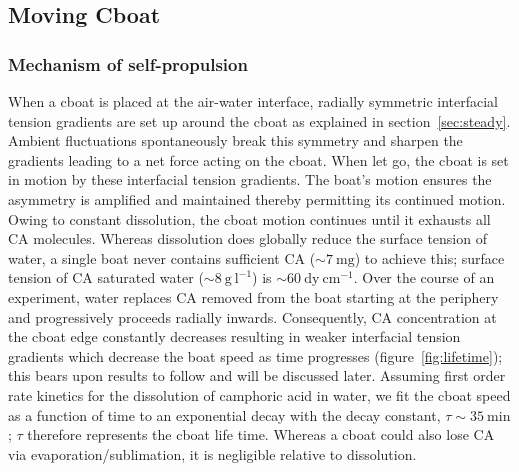 \documentclass[journal=langd5, manuscript=article, layout=twocolumn]{achemso}
\begin{document}
\subsection{Moving Cboat}
\subsubsection{Mechanism of self-propulsion}
\label{sec:propmech}
When a cboat is placed at the air-water interface, radially symmetric interfacial tension gradients are set up around the cboat as explained in section~\ref{sec:steady}. Ambient fluctuations spontaneously break this symmetry and sharpen the gradients leading to a net force acting on the cboat. When let go, the cboat is set in motion by these interfacial tension gradients. The boat's motion ensures the asymmetry is amplified and maintained thereby permitting its continued motion. Owing to constant dissolution, the cboat motion continues until it exhausts all CA molecules. Whereas dissolution does globally reduce the surface tension of water, a single boat never contains sufficient CA ($\sim 7\ \mathrm{mg}$) to achieve this; surface tension of CA saturated water ($\sim 8\ \mathrm{g\ l^{-1}}$) is $\sim 60\ \mathrm{dy\ cm^{-1}}$. Over the course of an experiment, water replaces CA removed from the boat starting at the periphery and progressively proceeds radially inwards. Consequently, CA concentration at the cboat edge constantly decreases resulting in weaker interfacial tension gradients which decrease the boat speed as time progresses (figure~\ref{fig:lifetime}); this bears upon results to follow and will be discussed later. Assuming first order rate kinetics \cite{atkins2014} for the dissolution of camphoric acid in water, we fit the cboat speed as a function of time to an exponential decay with the decay constant, $\tau \sim 35\ \mathrm{min}$; $\tau$ therefore represents the cboat life time. Whereas a cboat could also lose CA via evaporation/sublimation, it is negligible relative to dissolution.
\end{document}
